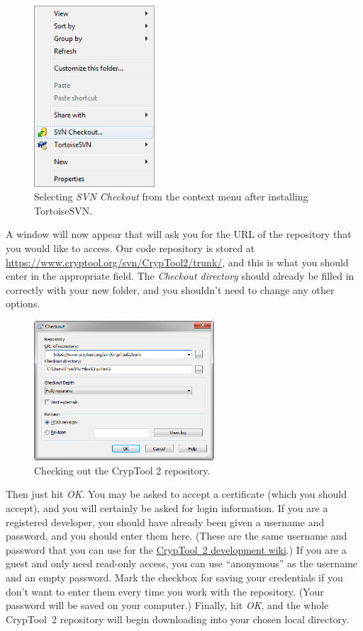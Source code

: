 \begin{figure}[h!]
	\centering
		\includegraphics[width=0.40\textwidth]{figures/tortoise_svn_checkout.png}
	\caption{Selecting \textit{SVN Checkout} from the context menu after installing TortoiseSVN.}
	\label{fig:tortoise_svn_checkout}
\end{figure}
\clearpage

A window will now appear that will ask you for the URL of the repository that you would like to access. Our code repository is stored at \url{https://www.cryptool.org/svn/CrypTool2/trunk/}, and this is what you should enter in the appropriate field. The \textit{Checkout directory} should already be filled in correctly with your new folder, and you shouldn't need to change any other options.

\begin{figure}[h!]
	\centering
		\includegraphics[width=0.60\textwidth]{figures/tortoise_svn_checkout_window.png}
	\caption{Checking out the CrypTool 2 repository.}
	\label{fig:tortoise_svn_checkout2}
\end{figure}

Then just hit \textit{OK}. You may be asked to accept a certificate (which you should accept), and you will certainly be asked for login information. If you are a registered developer, you should have already been given a username and password, and you should enter them here. (These are the same username and password that you can use for the \href{https://www.cryptool.org/trac/CrypTool2/wiki}{CrypTool~2 development wiki}.) If you are a guest and only need read-only access, you can use ``anonymous'' as the username and an empty password. Mark the checkbox for saving your credentials if you don't want to enter them every time you work with the repository. (Your password will be saved on your computer.) Finally, hit \textit{OK}, and the whole CrypTool~2 repository will begin downloading into your chosen local directory.


